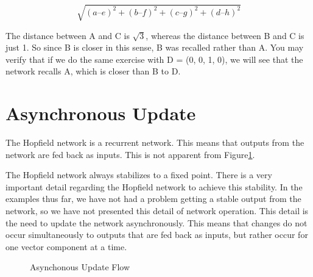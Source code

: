 \[\sqrt{(a – e)^2 + (b – f)^2 + (c – g)^2 + (d – h)^2}\]

The distance between A and C is $\sqrt{3}$, whereas the distance between B and
C is just 1. So since B is closer in this sense, B was recalled rather than A. You
may verify that if we do the same exercise with D = (0, 0, 1, 0), we will see
that the network recalls A, which is closer than B to D.


\section{Asynchronous Update}

The Hopfield network is a recurrent network. This means that outputs from
the network are fed back as inputs. This is not apparent from Figure\ref{fig:asynchonous_update_flow}.

The Hopfield network always stabilizes to a fixed point. There is a very
important detail regarding the Hopfield network to achieve this stability. In the
examples thus far, we have not had a problem getting a stable output from the
network, so we have not presented this detail of network operation. This detail
is the need to update the network asynchronously. This means that changes do
not occur simultaneously to outputs that are fed back as inputs, but rather
occur for one vector component at a time.

\begin{figure}[!ht] %
\caption{Asynchonous Update Flow}
\label{fig:asynchonous_update_flow}
\centering
{}
\end{figure}

